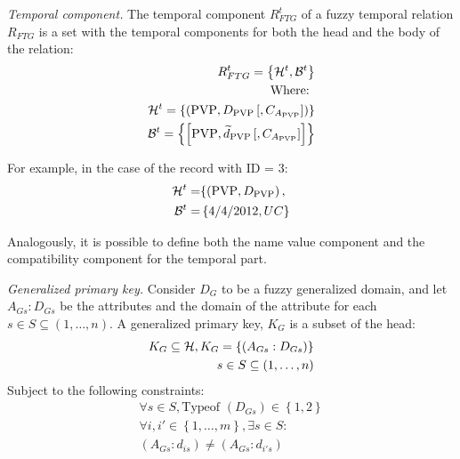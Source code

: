 \begin{definition}
\label{def:temporal-component}
\emph{Temporal component.}
The temporal component $R^{t}_{FTG}$ of a fuzzy temporal relation $R_{FTG}$ is a set with the temporal components for both the head and the body of the relation:
\begin{align}
\label{eq:temporal-component}
R^{t}_{FTG} = \left \lbrace \mathcal{H}^{t},\mathcal{B}^{t} \right \rbrace \\
\nonumber
\text{Where: } \\
\nonumber
\mathcal{H}^{t} = \left \lbrace \left( \text{PVP}, D_{\text{PVP}}\left[,C_{A_{\text{PVP}}} \right] \right) \right \rbrace \\
\nonumber
\mathcal{B}^ {t} = \left \lbrace  \left[ \text{PVP}, \widetilde{d}_{\text{PVP}} \left[,C_{A_{\text{PVP}}} \right] \right]  \right \rbrace 
\end{align}
\end{definition}

For example, in the case of the record with ID = 3:
\begin{align}
\nonumber
\mathcal{H}^{t} = & \lbrace \left( \text{PVP}, D_{\text{PVP}}\right),\\
\nonumber
\mathcal{B}^ {t} =& \left \lbrace 4/4/2012 , UC \right \rbrace 
\end{align}


Analogously, it is possible to define both the name value component and the compatibility component for the temporal part.


\begin{definition}
\label{def:generalized-primary-key}
\emph{Generalized primary key.}
Consider $D_G$ to be a fuzzy generalized domain, and let $A_{Gs}:D_{Gs}$ be the attributes and the domain of the attribute for each $s \in S \subseteq \left(1, \ldots, n \right)$.
A generalized primary key, $K_G$ is a subset of the head:
\begin{align}
\label{eq:generalized-primary-key}
K_G \subseteq \mathcal{H}, K_G = \left \lbrace  \left(A_{Gs}:D_{Gs} \right) \right \rbrace \\
\nonumber
s\in S \subseteq \left(1, \ldots, n \right) \\
\end{align}
Subject to the following constraints:
\begin{align}
\forall s \in S, \text{Typeof } \left(D_{Gs} \right) \in \left \lbrace 1, 2 \right \rbrace \\
\nonumber
\forall i, i' \in \left \lbrace 1, \ldots, m\right \rbrace , \exists s \in S: \\
\nonumber
\left(A_{Gs}:d_{is} \right) \neq \left(A_{Gs}:d_{i's} \right)
\end{align}
\end{definition}

